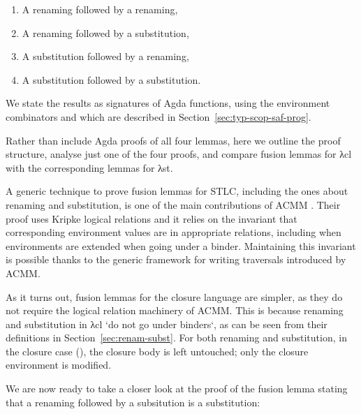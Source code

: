 \documentclass[bsc,frontabs,oneside,singlespacing,parskip,deptreport]{infthesis}
\theoremstyle{definition}
\theoremstyle{lemma}
\begin{document}
\begin{enumerate}[nolistsep]
  \item A renaming followed by a renaming,
  \item A renaming followed by a substitution,
  \item A substitution followed by a renaming,
  \item A substitution followed by a substitution.
\end{enumerate}

We state the results as signatures of Agda functions, using the
environment combinators \AS{\_<\$>\_} and  which are described
in Section~\ref{sec:typ-scop-saf-prog}.


Rather than include Agda proofs of all four lemmas, here we outline
the proof structure, analyse just one of the four proofs, and compare
fusion lemmas for λcl with the corresponding lemmas for λst.

A generic technique to prove fusion lemmas for STLC, including the
ones about renaming and substitution, is one of the main contributions
of ACMM \cite{DBLP:conf/cpp/Allais0MM17}. Their proof uses Kripke
logical relations and it relies on the invariant that corresponding
environment values are in appropriate relations, including when
environments are extended when going under a binder. Maintaining this
invariant is possible thanks to the generic framework for writing
traversals introduced by ACMM.

As it turns out, fusion lemmas for the closure language are simpler,
as they do not require the logical relation machinery of ACMM. This is
because renaming and substitution in λcl `do not go under binders`, as
can be seen from their definitions in
Section~\ref{sec:renam-subst}. For both renaming and substitution, in
the closure case (), the closure body is left untouched; only
the closure environment is modified.

We are now ready to take a closer look at the proof of the fusion
lemma stating that a renaming followed by a subsitution is a
substitution:

\end{document}
